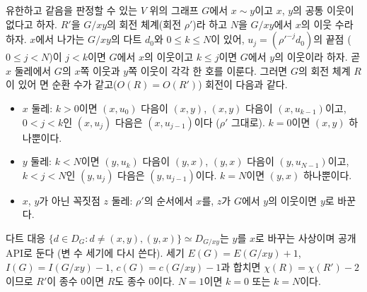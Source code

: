 \begin{lemma}
\label{lem:uncontract}
\leanok
유한하고 같음을 판정할 수 있는 \(V\) 위의 그래프 \(G\)에서 \(x \sim y\)이고 \(x\), \(y\)의 공통 이웃이 없다고 하자.
\(R'\)을 \(G/xy\)의 회전 체계(회전 \(\rho'\))라 하고 \(N\)을 \(G/xy\)에서 \(x\)의 이웃 수라 하자.
\(x\)에서 나가는 \(G/xy\)의 다트 \(d_0\)와 \(0 \le k \le N\)이 있어, \(u_j = (\rho'^{-j} d_0)\)의 끝점
(\(0 \le j < N\))이 \(j < k\)이면 \(G\)에서 \(x\)의 이웃이고 \(k \le j\)이면 \(G\)에서 \(y\)의 이웃이라 하자.
곧 \(x\) 둘레에서 \(G\)의 \(x\)쪽 이웃과 \(y\)쪽 이웃이 각각 한 호를 이룬다. 그러면 \(G\)의 회전 체계 \(R\)이 있어
면 순환 수가 같고(\(O(R) = O(R')\)) 회전이 다음과 같다.
\begin{itemize}
  \item \(x\) 둘레: \(k > 0\)이면 \((x, u_0)\) 다음이 \((x, y)\), \((x, y)\) 다음이 \((x, u_{k-1})\)이고,
        \(0 < j < k\)인 \((x, u_j)\) 다음은 \((x, u_{j-1})\)이다 (\(\rho'\) 그대로). \(k = 0\)이면 \((x, y)\) 하나뿐이다.
  \item \(y\) 둘레: \(k < N\)이면 \((y, u_k)\) 다음이 \((y, x)\), \((y, x)\) 다음이 \((y, u_{N-1})\)이고,
        \(k < j < N\)인 \((y, u_j)\) 다음은 \((y, u_{j-1})\)이다. \(k = N\)이면 \((y, x)\) 하나뿐이다.
  \item \(x\), \(y\)가 아닌 꼭짓점 \(z\) 둘레: \(\rho'\)의 순서에서 \(x\)를, \(z\)가 \(G\)에서 \(y\)의 이웃이면 \(y\)로 바꾼다.
\end{itemize}
다트 대응 \(\{d \in D_G : d \ne (x,y), (y,x)\} \simeq D_{G/xy}\)는 \(y\)를 \(x\)로 바꾸는 사상이며 공개 API로 둔다
(변 수 세기에 다시 쓴다). 세기 \(E(G) = E(G/xy) + 1\), \(I(G) = I(G/xy) - 1\), \(c(G) = c(G/xy) - 1\)과 합치면
\(\chi(R) = \chi(R') - 2\)이므로 \(R'\)이 종수 0이면 \(R\)도 종수 0이다. \(N = 1\)이면 \(k = 0\) 또는 \(k = N\)이다.
\end{lemma}

